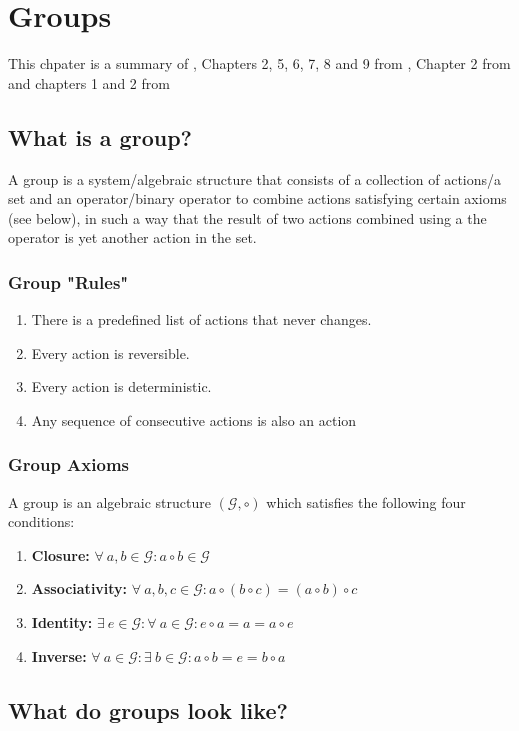 \chapter{Groups}
This chpater is a summary of \cite{Nathan}, Chapters 2, 5, 6, 7, 8 and 9 from \cite{Artin}, Chapter 2 from \cite{Stillwell} and chapters 1 and 2 from 
\section{What is a group?}
A group is a system/algebraic structure that consists of a collection of actions/a set and an operator/binary operator to combine actions satisfying certain axioms (see below), in such a way that the result of two actions combined using a the operator is yet another action in the set.
\subsection{Group "Rules"}
\begin{enumerate}
	\item There is a predefined list of actions that never changes.
	\item Every action is reversible.
	\item Every action is deterministic.
	\item Any sequence of consecutive actions is also an action
\end{enumerate}
\subsection{Group Axioms}
A group is an algebraic structure $(\mathcal{G},\circ)$ which satisfies the following four conditions:
\begin{enumerate}
	\item \textbf{Closure:} $\forall \ a,b \in \mathcal{G}: a \circ b \in \mathcal{G}$ 
	\item \textbf{Associativity:} $\forall \ a, b, c \in \mathcal{G}: a \circ (b \circ c)  = (a \circ b) \circ c $   	  
	\item \textbf{Identity:} $\exists \ e \in \mathcal{G}: \forall \ a \in \mathcal{G}: e \circ a = a = a \circ e $
	\item \textbf{Inverse:} $ \forall \ a \in \mathcal{G}: \exists \  b \in \mathcal{G}: a \circ b = e = b \circ a$  	  %
\end{enumerate}
\section{What do groups look like?}
